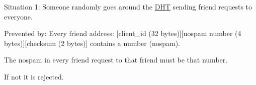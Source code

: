 Situation 1\+: Someone randomly goes around the \hyperlink{struct_d_h_t}{D\+H\+T} sending friend requests to everyone.

Prevented by\+: Every friend address\+: \mbox{[}client\+\_\+id (32 bytes)\mbox{]}\mbox{[}nospam number (4 bytes)\mbox{]}\mbox{[}checksum (2 bytes)\mbox{]} contains a number (nospam).

The nospam in every friend request to that friend must be that number.

If not it is rejected. 